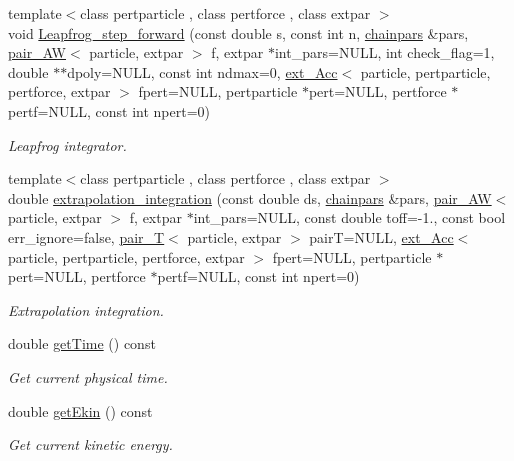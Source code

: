 \begin{DoxyCompactItemize}
{\footnotesize template$<$class pertparticle , class pertforce , class extpar $>$ }\\void \hyperlink{classARC_1_1chain_a991a386117bf0597a46cba3b7f356978}{Leapfrog\+\_\+step\+\_\+forward} (const double s, const int n, \hyperlink{classARC_1_1chainpars}{chainpars} \&pars, \hyperlink{namespaceARC_a270b4c77765cacf073a5ef5f928f1d63}{pair\+\_\+\+AW}$<$ particle, extpar $>$ f, extpar $\ast$int\+\_\+pars=N\+U\+LL, int check\+\_\+flag=1, double $\ast$$\ast$dpoly=N\+U\+LL, const int ndmax=0, \hyperlink{namespaceARC_a7aeda3b3bd009af7ac964748834dd312}{ext\+\_\+\+Acc}$<$ particle, pertparticle, pertforce, extpar $>$ fpert=N\+U\+LL, pertparticle $\ast$pert=N\+U\+LL, pertforce $\ast$pertf=N\+U\+LL, const int npert=0)
\begin{DoxyCompactList}\small\item\em Leapfrog integrator. \end{DoxyCompactList}\item 
{\footnotesize template$<$class pertparticle , class pertforce , class extpar $>$ }\\double \hyperlink{classARC_1_1chain_af8f59f60d18fff66ef7102a74b4a8838}{extrapolation\+\_\+integration} (const double ds, \hyperlink{classARC_1_1chainpars}{chainpars} \&pars, \hyperlink{namespaceARC_a270b4c77765cacf073a5ef5f928f1d63}{pair\+\_\+\+AW}$<$ particle, extpar $>$ f, extpar $\ast$int\+\_\+pars=N\+U\+LL, const double toff=-\/1., const bool err\+\_\+ignore=false, \hyperlink{namespaceARC_aa489b85f285776ca334a82d85dc0381a}{pair\+\_\+T}$<$ particle, extpar $>$ pairT=N\+U\+LL, \hyperlink{namespaceARC_a7aeda3b3bd009af7ac964748834dd312}{ext\+\_\+\+Acc}$<$ particle, pertparticle, pertforce, extpar $>$ fpert=N\+U\+LL, pertparticle $\ast$pert=N\+U\+LL, pertforce $\ast$pertf=N\+U\+LL, const int npert=0)
\begin{DoxyCompactList}\small\item\em Extrapolation integration. \end{DoxyCompactList}\item 
double \hyperlink{classARC_1_1chain_aa807a8b8c4e2b064313b1457949edadd}{get\+Time} () const 
\begin{DoxyCompactList}\small\item\em Get current physical time. \end{DoxyCompactList}\item 
double \hyperlink{classARC_1_1chain_a72e8fe061d668b6a7f5e12656739dfc0}{get\+Ekin} () const 
\begin{DoxyCompactList}\small\item\em Get current kinetic energy. \end{DoxyCompactList}\item 
$$
\end{DoxyCompactItemize}
